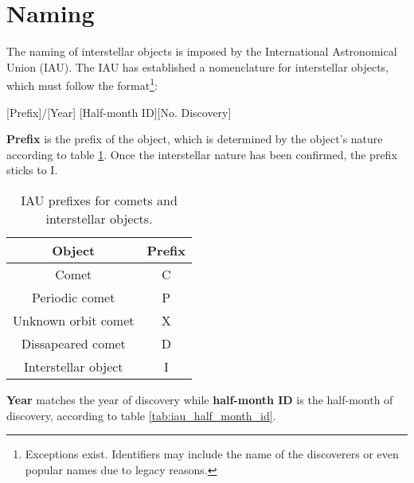 \newpage
\section{Naming}

The naming of interstellar objects is imposed by the International Astronomical
Union (IAU). The IAU has established a nomenclature for interstellar objects,
which must follow the format\footnote{Exceptions exist. Identifiers may include
the name of the discoverers or even popular names due to legacy reasons.}:

\begin{center}
    [Prefix]/[Year] [Half-month ID][No. Discovery]
\end{center}

\textbf{Prefix} is the prefix of the object, which is determined by the object's
nature according to table \ref{tab:iau_prefixes}. Once the interstellar nature has
been confirmed, the prefix sticks to I.

\begin{table}[H]
    \centering
    \begin{tabular}{|c|c|}
        \hline
        \textbf{Object} & \textbf{Prefix} \\
        \hline
        Comet & C \\
        Periodic comet & P \\
        Unknown orbit comet & X \\
        Dissapeared comet & D \\
        Interstellar object & I \\
        \hline
    \end{tabular}
    \caption{IAU prefixes for comets and interstellar objects.}
    \label{tab:iau_prefixes}
\end{table}

\textbf{Year} matches the year of discovery while \textbf{half-month ID} is the
half-month of discovery, according to table \ref{tab:iau_half_month_id}.

